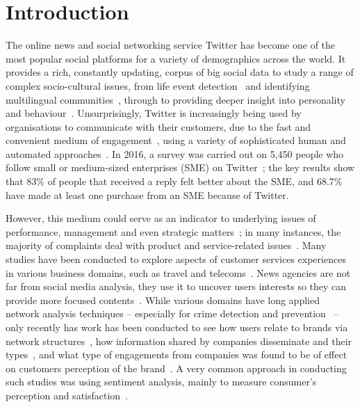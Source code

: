 \documentclass[sigconf]{acmart}
\begin{document}

\maketitle

\section{Introduction}\label{intro}

The online news and social networking service Twitter has become one
of the most popular social platforms for a variety of demographics
across the world. It provides a rich, constantly updating, corpus of
big social data to study a range of complex socio-cultural issues,
from life event detection~\cite{blamey-et-al-2013} and identifying
multilingual communities~\cite{albishry-et-al:iccci2017}, through to
providing deeper insight into personality and
behaviour~\cite{mostafa-et-al-ai2016}. Unsurprisingly, Twitter is
increasingly being used by organisations to communicate with their
customers, due to the fast and convenient medium of
engagement~\cite{ma-et-al:2015}, using a variety of sophisticated
human and automated
approaches~\cite{verhagen-et-al:2014,xu-et-al:2017}. In 2016, a survey
was carried out on 5,450 people who follow small or medium-sized
enterprises (SME) on Twitter~\cite{Twitter2016}; the key results show
that 83\% of people that received a reply felt better about the SME,
and 68.7\% have made at least one purchase from an SME because of
Twitter.

However, this medium could serve as an indicator to underlying issues
of performance, management and even strategic
matters~\cite{gregoire-et-al:2015}; in many instances, the majority of
complaints deal with product and service-related
issues~\cite{einwiller+steilen:2015}. Many studies have been conducted
to explore aspects of customer services experiences in various
business domains, such as travel and
telecoms~\cite{Shakeel2017,Zhang2016,Wattimena2017,misopoulos-et-al:2014,Khatoon2017}.
News agencies are not far from social media analysis, they use it to
uncover users interests so they can provide more focused
contents~\cite{Nigam2016}. While various domains have long applied
network analysis techniques -- especially for crime detection and
prevention~\cite{oatley+crick:2015,oatley-et-al:dasc2015} -- only
recently has work has been conducted to see how users relate to brands
via network structures~\cite{Cutler2017}, how information shared by
companies disseminate and their types~\cite{Piccialli2017}, and what
type of engagements from companies was found to be of effect on
customers perception of the brand~\cite{Ibrahim2017}. A very common
approach in conducting such studies was using sentiment analysis,
mainly to measure consumer's perception and
satisfaction~\cite{Zhang2016,Al-Hussaini2017}.
\end{document}
